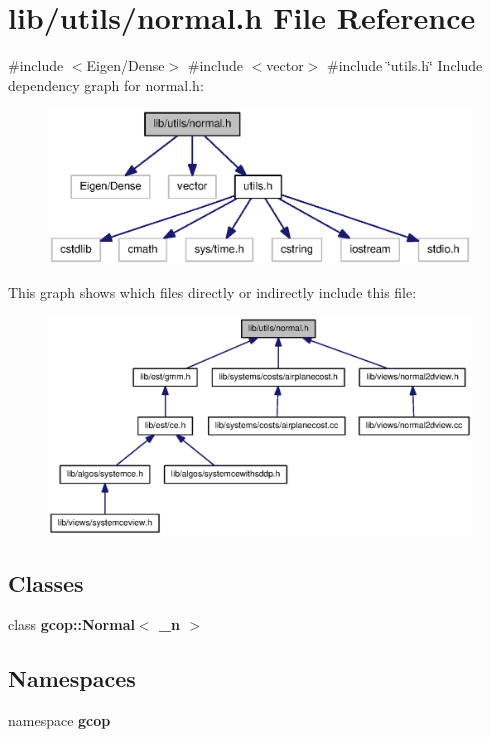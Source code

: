 \section{lib/utils/normal.h \-File \-Reference}
\label{normal_8h}
{\ttfamily \#include $<$\-Eigen/\-Dense$>$}\*
{\ttfamily \#include $<$vector$>$}\*
{\ttfamily \#include \char`\"{}utils.\-h\char`\"{}}\*
\-Include dependency graph for normal.\-h\-:
\nopagebreak
\begin{figure}[H]
\begin{center}
\leavevmode
\includegraphics[width=350pt]{normal_8h__incl}
\end{center}
\end{figure}
\-This graph shows which files directly or indirectly include this file\-:
\nopagebreak
\begin{figure}[H]
\begin{center}
\leavevmode
\includegraphics[width=350pt]{normal_8h__dep__incl}
\end{center}
\end{figure}
\subsection*{\-Classes}
\begin{DoxyCompactItemize}
\item 
class {\bf gcop\-::\-Normal$<$ \-\_\-n $>$}
\end{DoxyCompactItemize}
\subsection*{\-Namespaces}
\begin{DoxyCompactItemize}
\item 
namespace {\bf gcop}
\end{DoxyCompactItemize}
